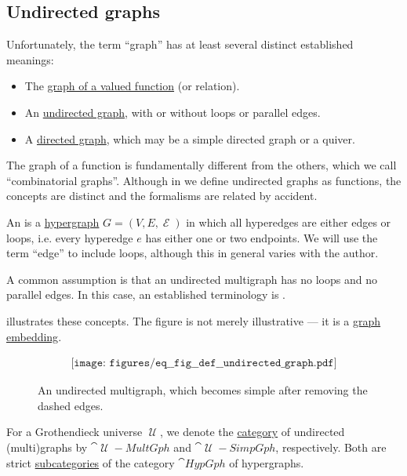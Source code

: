 \subsection{Undirected graphs}\label{subsec:undirected_graphs}

\begin{remark}\label{rem:graph_etymology}
  Unfortunately, the term \enquote{graph} has at least several distinct established meanings:
  \begin{itemize}
    \item The \hyperref[def:multi_valued_function/graph]{graph of a valued function} (or relation).
    \item An \hyperref[def:undirected_graph]{undirected graph}, with or without loops or parallel edges.
    \item A \hyperref[def:quiver]{directed graph}, which may be a simple directed graph or a quiver.
  \end{itemize}

  The graph of a function is fundamentally different from the others, which we call \enquote{combinatorial graphs}. Although in  we define undirected graphs as functions, the concepts are distinct and the formalisms are related by accident.
\end{remark}

\begin{definition}\label{def:undirected_graph}
  An  is a \hyperref[def:hypergraph]{hypergraph} \( G = (V, E, \mscrE) \) in which all hyperedges are either edges or loops, i.e. every hyperedge \( e \) has either one or two endpoints. We will use the term \enquote{edge} to include loops, although this in general varies with the author.

  A common assumption is that an undirected multigraph has no loops and no parallel edges. In this case, an established terminology is .

   illustrates these concepts. The figure is not merely illustrative --- it is a \hyperref[def:graph_geometric_realization/embedding]{graph embedding}.

  \begin{figure}[h]
    \begin{equation}\label{eq:fig:def:undirected_graph}
      \begin{aligned}
        \texttt{[image: figures/eq\_\_fig\_\_def\_\_undirected\_graph.pdf]}
      \end{aligned}
    \end{equation}
    \caption{An undirected multigraph, which becomes simple after removing the dashed edges.}\label{fig:def:undirected_graph}
  \end{figure}

  For a Grothendieck universe \( \mscrU \), we denote the \hyperref[def:category]{category} of undirected (multi)graphs by \( \cat{\mscrU-MultGph} \) and \( \cat{\mscrU-SimpGph} \), respectively. Both are strict \hyperref[def:subcategory]{subcategories} of the category \hyperref[def:category_of_small_hypergraphs]{\( \cat{HypGph} \)} of hypergraphs.
\end{definition}

